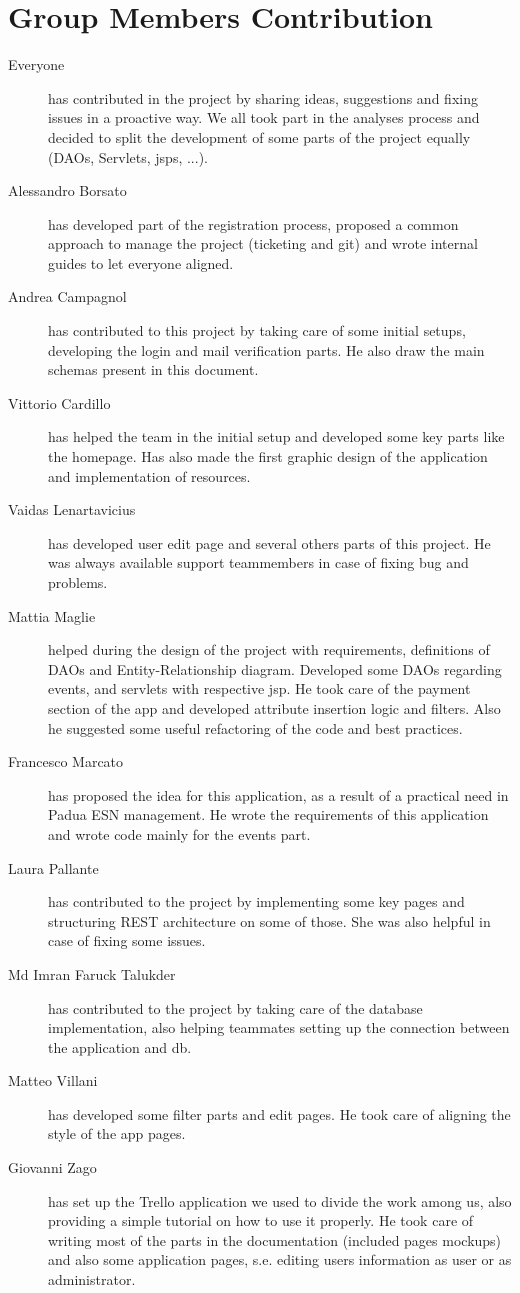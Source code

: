\section{Group Members Contribution}

\begin{description}
    \item[Everyone] has contributed in the project by sharing ideas, suggestions and fixing issues in a proactive way. We all took part in the analyses process and decided to split the development of some parts of the project equally (DAOs, Servlets, jsps, ...).
    \item[Alessandro Borsato] has developed part of the registration process, proposed a common approach to manage the project (ticketing and git) and wrote internal guides to let everyone aligned.
    \item[Andrea Campagnol] has contributed to this project by taking care of some initial setups, developing the login and mail verification parts. He also draw the main schemas present in this document.
    \item[Vittorio Cardillo] has helped the team in the initial setup and developed some key parts like the homepage. Has also made the first graphic design of the application and implementation of resources.
    \item[Vaidas Lenartavicius] has developed user edit page and several others parts of this project. He was always available support teammembers in case of fixing bug and problems.
    \item[Mattia Maglie] helped during the design of the project with requirements, definitions of DAOs and Entity-Relationship diagram. Developed some DAOs regarding events, and servlets with respective jsp. He took care of the payment section of the app and developed attribute insertion logic and filters. Also he suggested some useful refactoring of the code and best practices.
    \item[Francesco Marcato] has proposed the idea for this application, as a result of a practical need in Padua ESN management. He wrote the requirements of this application and wrote code mainly for the events part.
    \item[Laura Pallante] has contributed to the project by implementing some key pages and structuring REST architecture on some of those. She was also helpful in case of fixing some issues.
    \item[Md Imran Faruck Talukder] has contributed to the project by taking care of the database implementation, also helping teammates setting up the connection between the application and db.
    \item[Matteo Villani] has developed some filter parts and edit pages. He took care of aligning the style of the app pages.
    \item[Giovanni Zago] has set up the Trello application we used to divide the work among us, also providing a simple tutorial on how to use it properly. He took care of writing most of the parts in the documentation (included pages mockups) and also some application pages, s.e. editing users information as user or as administrator.
\end{description}